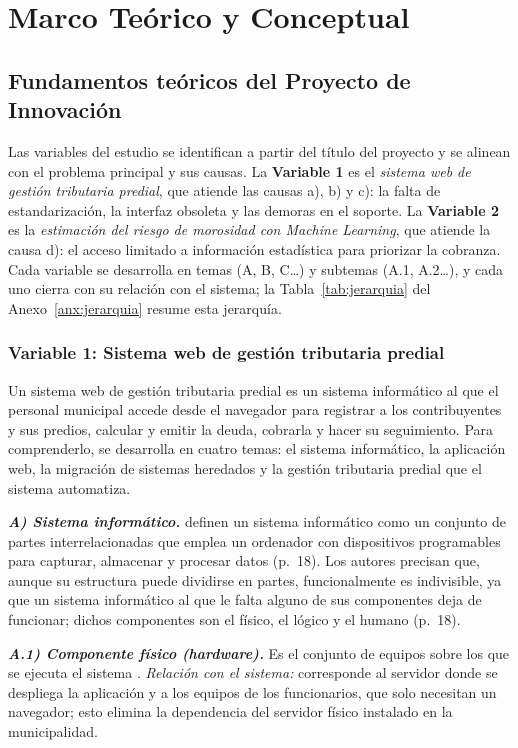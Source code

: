 \documentclass[12pt,a4paper]{report}
\begin{document}
\section{Marco Teórico y Conceptual}
\label{sec:marco}

\subsection{Fundamentos teóricos del Proyecto de Innovación}

Las variables del estudio se identifican a partir del título del proyecto y se alinean con el problema principal y sus causas. La \textbf{Variable 1} es el \textit{sistema web de gestión tributaria predial}, que atiende las causas a), b) y c): la falta de estandarización, la interfaz obsoleta y las demoras en el soporte. La \textbf{Variable 2} es la \textit{estimación del riesgo de morosidad con Machine Learning}, que atiende la causa d): el acceso limitado a información estadística para priorizar la cobranza. Cada variable se desarrolla en temas (A, B, C\ldots) y subtemas (A.1, A.2\ldots), y cada uno cierra con su relación con el sistema; la Tabla~\ref{tab:jerarquia} del Anexo~\ref{anx:jerarquia} resume esta jerarquía.

\subsubsection{Variable 1: Sistema web de gestión tributaria predial}

Un sistema web de gestión tributaria predial es un sistema informático al que el personal municipal accede desde el navegador para registrar a los contribuyentes y sus predios, calcular y emitir la deuda, cobrarla y hacer su seguimiento. Para comprenderlo, se desarrolla en cuatro temas: el sistema informático, la aplicación web, la migración de sistemas heredados y la gestión tributaria predial que el sistema automatiza.

\noindent\textbf{\textit{A) Sistema informático.}} \textcite{raya2014} definen un sistema informático como un conjunto de partes interrelacionadas que emplea un ordenador con dispositivos programables para capturar, almacenar y procesar datos (p.~18). Los autores precisan que, aunque su estructura puede dividirse en partes, funcionalmente es indivisible, ya que un sistema informático al que le falta alguno de sus componentes deja de funcionar; dichos componentes son el físico, el lógico y el humano (p.~18).

\noindent\textbf{\textit{A.1) Componente físico (hardware).}} Es el conjunto de equipos sobre los que se ejecuta el sistema \parencite{raya2014}. \textit{Relación con el sistema:} corresponde al servidor donde se despliega la aplicación y a los equipos de los funcionarios, que solo necesitan un navegador; esto elimina la dependencia del servidor físico instalado en la municipalidad.
\end{document}
